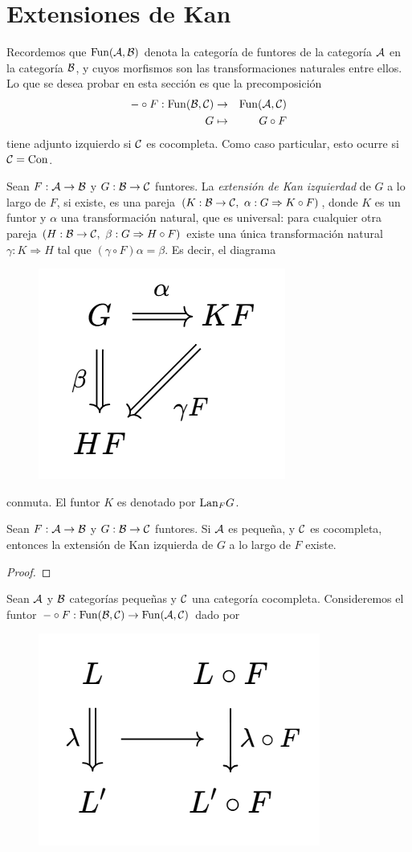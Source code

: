 \section{Extensiones de Kan}
Recordemos que ${\mathrm{Fun}}({\mathcal A},{\mathcal B})$ denota la categoría de funtores de la categoría ${\mathcal A}$ en la categoría ${\mathcal B}$, y cuyos morfismos son las transformaciones naturales entre ellos. Lo que se desea probar en esta sección es que la precomposición 
\begin{eqnarray*}
-\circ F:{\mathrm{Fun}}({\mathcal B},{\mathcal C})&\to&{\mathrm{Fun}}({\mathcal A},{\mathcal C})\\
G&\mapsto& G\circ F
\end{eqnarray*}
tiene adjunto izquierdo si ${\mathcal C}$ es cocompleta. Como caso particular, esto ocurre si ${\mathcal C}={\mathrm{Con}}$.
\begin{definition}
    Sean $F:{\mathcal A}\to {\mathcal B}$  y $G:{\mathcal B}\to {\mathcal C}$ funtores. La \emph{extensión de Kan izquierdad} de $G$ a lo largo de $F$, si existe, es una pareja $(K:{\mathcal B}\to{\mathcal C},\text{ }\alpha:G\Rightarrow K\circ F)$, donde $K$ es un funtor y $\alpha$ una transformación natural, que es universal: para cualquier otra pareja $(H:{\mathcal B}\to{\mathcal C},\text{ }\beta: G\Rightarrow H\circ F )$ existe una única transformación natural $\gamma: K\Rightarrow H$ tal que $(\gamma\circ F)\alpha=\beta$. Es decir, el diagrama 
    \begin{figure}[H]
        \centering
        \includegraphics[width=0.2\linewidth]{img/diagram1.4.6.png}
    \end{figure}
    conmuta. El funtor $K$ es denotado por ${\mathrm{Lan}}_F G$.
\end{definition}
\begin{theo}
    Sean $F:{\mathcal A}\to{\mathcal B}$ y $G:{\mathcal B}\to{\mathcal C}$ funtores. Si ${\mathcal A}$ es pequeña, y ${\mathcal C}$ es cocompleta, entonces la extensión de Kan izquierda de $G$ a lo largo de $F$ existe.
\end{theo}
\begin{proof}
\end{proof}
Sean ${\mathcal A}$ y ${\mathcal B}$ categorías pequeñas y ${\mathcal C}$ una categoría cocompleta. Consideremos el funtor $-\circ F:{\mathrm{Fun}}({\mathcal B},{\mathcal C})\to{\mathrm{Fun}}({\mathcal A},{\mathcal C})$ dado por 
    \begin{figure}[H]
        \centering
        \includegraphics[width=0.25\linewidth]{img/diagram1.4.7.png}
    \end{figure}
